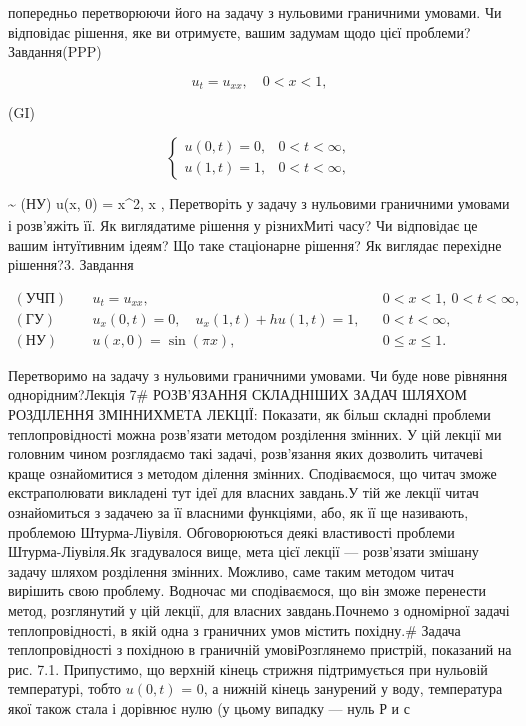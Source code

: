 \documentclass[
  ukrainian,
]{article}
\begin{document}
попередньо перетворюючи його на задачу з нульовими граничними умовами.
Чи відповідає рішення, яке ви отримуєте, вашим задумам щодо цієї
проблеми?Завдання(PPP)

\[
u_t = u_{xx}, \quad 0 < x < 1,
\]

(GI)

\[
\begin{cases} u(0, t) = 0, & 0 < t < \infty, \\ u(1, t) = 1, & 0 < t < \infty, \end{cases}
\]

\textsubscript{}\textasciitilde{} (НУ) u(x, 0) = x\^{}2,  \le x
, Перетворіть у задачу з нульовими граничними умовами і розв'яжіть
її. Як виглядатиме рішення у різнихМиті часу? Чи відповідає це вашим
інтуїтивним ідеям? Що таке стаціонарне рішення? Як виглядає перехідне
рішення?3. Завдання

\[
\begin{aligned}
(\text{УЧП})\quad & u_t = u_{xx}, && 0 < x < 1,\ 0 < t < \infty, \\
(\text{ГУ})\quad & u_x(0,t) = 0,\quad u_x(1,t) + h u(1,t) = 1, && 0 < t < \infty, \\
(\text{НУ})\quad & u(x,0) = \sin(\pi x), && 0 \leqslant x \leqslant 1.
\end{aligned}
\]

Перетворимо на задачу з нульовими граничними умовами. Чи буде нове
рівняння однорідним?Лекція 7\# РОЗВ'ЯЗАННЯ СКЛАДНІШИХ ЗАДАЧ ШЛЯХОМ
РОЗДІЛЕННЯ ЗМІННИХМЕТА ЛЕКЦІЇ: Показати, як більш складні проблеми
теплопровідності можна розв'язати методом розділення змінних. У цій
лекції ми головним чином розглядаємо такі задачі, розв'язання яких
дозволить читачеві краще ознайомитися з методом ділення змінних.
Сподіваємося, що читач зможе екстраполювати викладені тут ідеї для
власних завдань.У тій же лекції читач ознайомиться з задачею за її
власними функціями, або, як її ще називають, проблемою Штурма-Ліувіля.
Обговорюються деякі властивості проблеми Штурма-Ліувіля.Як згадувалося
вище, мета цієї лекції --- розв'язати змішану задачу шляхом розділення
змінних. Можливо, саме таким методом читач вирішить свою проблему.
Водночас ми сподіваємося, що він зможе перенести метод, розглянутий у
цій лекції, для власних завдань.Почнемо з одномірної задачі
теплопровідності, в якій одна з граничних умов містить похідну.\# Задача
теплопровідності з похідною в граничній умовіРозглянемо пристрій,
показаний на рис. 7.1. Припустимо, що верхній кінець стрижня
підтримується при нульовій температурі, тобто \(u(0, t)\) = 0, а нижній
кінець занурений у воду, температура якої також стала і дорівнює нулю (у
цьому випадку --- нуль Р и с
\end{document}
